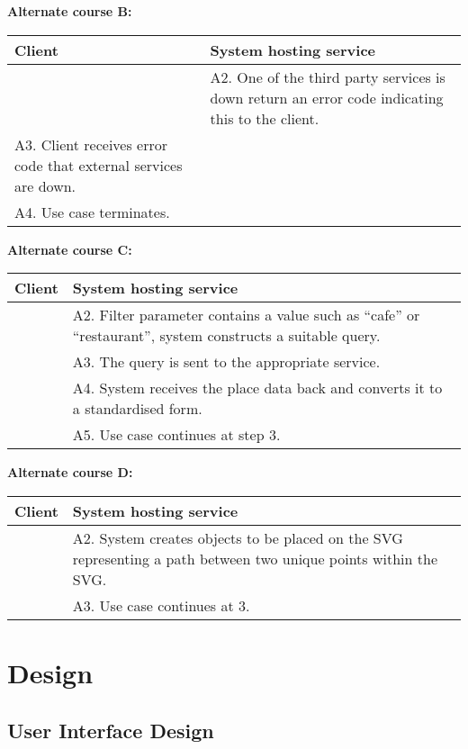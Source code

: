\documentclass[11pt,twoside,a4paper]{article}
\begin{document}
\noindent
\textbf{Alternate course B:}\\
\begin{tabularx}{\textwidth}{ |X|X| }
  \textbf{Client} & \textbf{System hosting service}\\
  \hline
  & A2. One of the third party services is down return an error code
  indicating this to the client.\\
  \hline
  A3. Client receives error code that external services are down. & \\
  \hline
  A4. Use case terminates. & \\
  \hline
\end{tabularx}

\noindent
\textbf{Alternate course C:}\\
\begin{tabularx}{\textwidth}{ |X|X| }
  \textbf{Client} & \textbf{System hosting service}\\
  \hline
  & A2. Filter parameter contains a value such as ``cafe'' or
  ``restaurant'', system constructs a suitable query.\\
  \hline
  & A3. The query is sent to the appropriate service.\\
  \hline
  & A4. System receives the place data back and converts it to a
  standardised form.\\
  \hline
  & A5. Use case continues at step 3.\\
  \hline
\end{tabularx}

\noindent
\textbf{Alternate course D:}\\
\begin{tabularx}{\textwidth}{ |X|X| }
  \textbf{Client} & \textbf{System hosting service}\\
  \hline
  & A2. System creates objects to be placed on the SVG representing a
  path between two unique points within the SVG.\\
  \hline
  & A3. Use case continues at 3.\\
  \hline
\end{tabularx}

\section{Design}

\subsection{User Interface Design}
\end{document}

